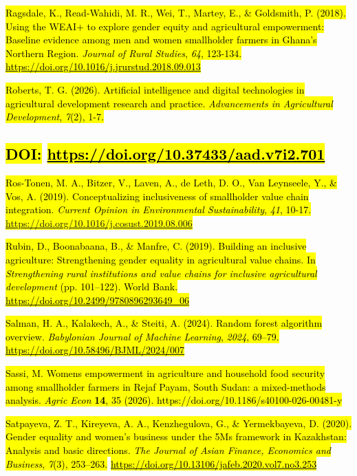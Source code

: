 \documentclass[
]{article}
\begin{document}
\hl{Ragsdale, K., Read-Wahidi, M. R., Wei, T., Martey, E., \& Goldsmith,
P. (2018). Using the WEAI+ to explore gender equity and agricultural
empowerment: Baseline evidence among men and women smallholder farmers
in Ghana's Northern Region. \emph{Journal of Rural Studies}, \emph{64},
123-134.}
\href{https://doi.org/10.1016/j.jrurstud.2018.09.013}{\hl{https://doi.org/10.1016/j.jrurstud.2018.09.013}}

\hl{Roberts, T. G. (2026). Artificial intelligence and digital
technologies in agricultural development research and practice.
\emph{Advancements in Agricultural Development}, \emph{7}(2), 1-7.}

\subsection{\texorpdfstring{\hl{DOI:}
\href{https://doi.org/10.37433/aad.v7i2.701}{\hl{https://doi.org/10.37433/aad.v7i2.701}}}{DOI: https://doi.org/10.37433/aad.v7i2.701}}\label{doi-httpsdoi.org10.37433aad.v7i2.701}

\hl{Ros-Tonen, M. A., Bitzer, V., Laven, A., de Leth, D. O., Van
Leynseele, Y., \& Vos, A. (2019). Conceptualizing inclusiveness of
smallholder value chain integration. \emph{Current Opinion in
Environmental Sustainability}, \emph{41}, 10-17.
\mbox{\url{https://doi.org/10.1016/j.cosust.2019.08.006}}}

\hl{Rubin, D., Boonabaana, B., \& Manfre, C. (2019). Building an
inclusive agriculture: Strengthening gender equality in agricultural
value chains. In \emph{Strengthening rural institutions and value chains
for inclusive agricultural development} (pp. 101--122). World Bank.}
\href{https://doi.org/10.2499/9780896293649_06}{\hl{https://doi.org/10.2499/9780896293649\_06}}

\hl{Salman, H. A., Kalakech, A., \& Steiti, A. (2024). Random forest
algorithm overview. \emph{Babylonian Journal of Machine Learning},
\emph{2024}, 69--79.}
\href{https://doi.org/10.58496/BJML/2024/007.}{\hl{https://doi.org/10.58496/BJML/2024/007}}

\hl{Sassi, M. Women\textquotesingle s empowerment in agriculture and
household food security among smallholder farmers in Rejaf Payam, South
Sudan: a mixed-methods analysis. \emph{Agric Econ} \textbf{14}, 35
(2026). https://doi.org/10.1186/s40100-026-00481-y}

\hl{Satpayeva, Z. T., Kireyeva, A. A., Kenzhegulova, G., \&
Yermekbayeva, D. (2020). Gender equality and women's business under the
5Ms framework in Kazakhstan: Analysis and basic directions. \emph{The
Journal of Asian Finance, Economics and Business}, \emph{7}(3),
253--263.}
\href{https://doi.org/10.13106/jafeb.2020.vol7.no3.253}{\hl{https://doi.org/10.13106/jafeb.2020.vol7.no3.253}}
\end{document}
